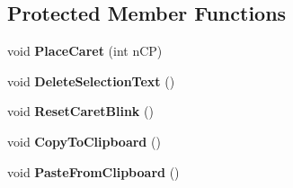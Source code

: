 \subsection*{Protected Member Functions}
\begin{DoxyCompactItemize}
\item 
\hypertarget{class_c_d_x_u_t_edit_box_a2719e73a4549625b2f08bacea7abf270}{void {\bfseries Place\+Caret} (int n\+C\+P)}\label{class_c_d_x_u_t_edit_box_a2719e73a4549625b2f08bacea7abf270}

\item 
\hypertarget{class_c_d_x_u_t_edit_box_a706a8b318a003975afc8db51ec233d70}{void {\bfseries Delete\+Selection\+Text} ()}\label{class_c_d_x_u_t_edit_box_a706a8b318a003975afc8db51ec233d70}

\item 
\hypertarget{class_c_d_x_u_t_edit_box_af04922715d7f262b0e21a98e969f6e9c}{void {\bfseries Reset\+Caret\+Blink} ()}\label{class_c_d_x_u_t_edit_box_af04922715d7f262b0e21a98e969f6e9c}

\item 
\hypertarget{class_c_d_x_u_t_edit_box_aebc41325d7ea210942b6c96c9df6d89e}{void {\bfseries Copy\+To\+Clipboard} ()}\label{class_c_d_x_u_t_edit_box_aebc41325d7ea210942b6c96c9df6d89e}

\item 
\hypertarget{class_c_d_x_u_t_edit_box_ace90835de5f93d652b474f0b6e16ba9b}{void {\bfseries Paste\+From\+Clipboard} ()}\label{class_c_d_x_u_t_edit_box_ace90835de5f93d652b474f0b6e16ba9b}

\end{DoxyCompactItemize}
